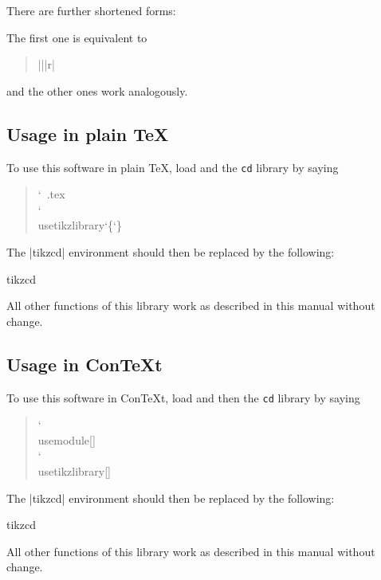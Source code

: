\documentclass[a4paper]{ltxdoc}
\begin{document}
There are further shortened forms:
\begin{pgfmanualentry}
  \extractcommand\rar{}\@@
  \extractcommand\lar{}\@@
  \extractcommand\dar{}\@@
  \extractcommand\uar{}\@@
  \extractcommand\drar{}\@@
  \extractcommand\urar{}\@@
  \extractcommand\dlar{}\@@
  \extractcommand\ular{}\@@
  \pgfmanualbody
\end{pgfmanualentry}
The first one is equivalent to
\begin{quote}
  |\arrow|{}|{r}|
\end{quote}
and the other ones work analogously.

\subsection{Usage in plain \TeX{}}
\label{sec:usage-plain-tex}

To use this software in plain \TeX{}, load \tikzname{} and the
\texttt{cd} library by saying
\begin{quote}
  \ttfamily\char`\ .tex\\
  \ttfamily\char`\\usetikzlibrary\char`\{\char`\}
\end{quote}
The |{tikzcd}| environment should then be replaced by the following:
\begin{plainenvironment}{{tikzcd}}
\end{plainenvironment}
All other functions of this library work as described in this manual
without change.

\subsection{Usage in Con\TeX t}
\label{sec:usage-plain-context}

To use this software in Con\TeX t, load \tikzname{} and then the
\texttt{cd} library by saying
\begin{quote}
  \ttfamily\char`\\usemodule[]\\
  \ttfamily\char`\\usetikzlibrary[]
\end{quote}
The |{tikzcd}| environment should then be replaced by the following:
\begin{contextenvironment}{{tikzcd}}
\end{contextenvironment}
All other functions of this library work as described in this manual
without change.
\end{document}
